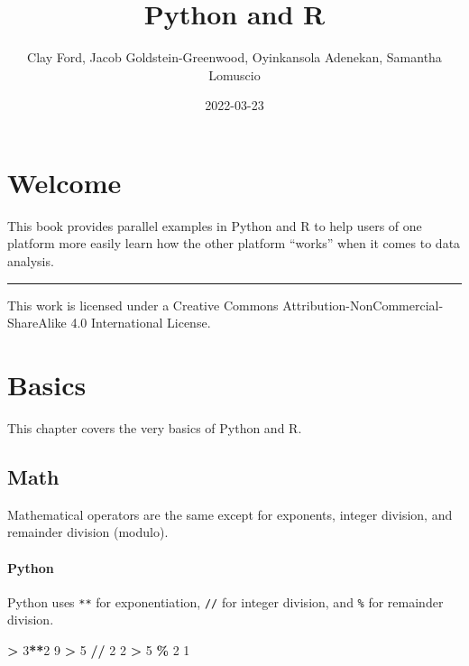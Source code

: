 \documentclass[
]{book}
\title{Python and R}
\author{Clay Ford, Jacob Goldstein-Greenwood, Oyinkansola Adenekan, Samantha Lomuscio}
\date{2022-03-23}
\newenvironment{Shaded}{\begin{snugshade}}{\end{snugshade}}
\newcommand{\DecValTok}[1]{\textcolor[rgb]{0.00,0.00,0.81}{#1}}
\newcommand{\OperatorTok}[1]{\textcolor[rgb]{0.81,0.36,0.00}{\textbf{#1}}}
\begin{document}
\maketitle

{
\setcounter{tocdepth}{1}
\tableofcontents
}
\hypertarget{welcome}{%
\chapter*{Welcome}\label{welcome}}

This book provides parallel examples in Python and R to help users of one platform more easily learn how the other platform ``works'' when it comes to data analysis.

\begin{center}\rule{0.5\linewidth}{0.5pt}\end{center}

This work is licensed under a Creative Commons Attribution-NonCommercial-ShareAlike 4.0 International License.

\hypertarget{basics}{%
\chapter{Basics}\label{basics}}

This chapter covers the very basics of Python and R.

\hypertarget{math}{%
\section{Math}\label{math}}

Mathematical operators are the same except for exponents, integer division, and remainder division (modulo).

\hypertarget{python}{%
\subsubsection*{Python}\label{python}}

Python uses \texttt{**} for exponentiation, \texttt{//} for integer division, and \texttt{\%} for remainder division.

\begin{Shaded}
\begin{Highlighting}[]
\OperatorTok{\textgreater{}} \DecValTok{3}\OperatorTok{**}\DecValTok{2}
\DecValTok{9}
\OperatorTok{\textgreater{}} \DecValTok{5} \OperatorTok{//} \DecValTok{2}
\DecValTok{2}
\OperatorTok{\textgreater{}} \DecValTok{5} \OperatorTok{\%} \DecValTok{2}
\DecValTok{1}
\end{Highlighting}
\end{Shaded}
\end{document}
